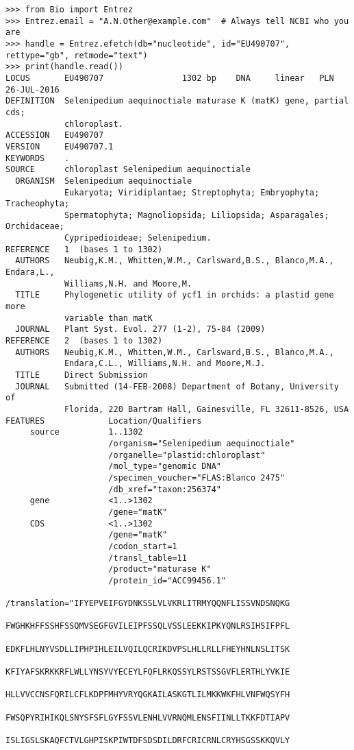 \begin{verbatim}
>>> from Bio import Entrez
>>> Entrez.email = "A.N.Other@example.com"  # Always tell NCBI who you are
>>> handle = Entrez.efetch(db="nucleotide", id="EU490707", rettype="gb", retmode="text")
>>> print(handle.read())
LOCUS       EU490707                1302 bp    DNA     linear   PLN 26-JUL-2016
DEFINITION  Selenipedium aequinoctiale maturase K (matK) gene, partial cds;
            chloroplast.
ACCESSION   EU490707
VERSION     EU490707.1
KEYWORDS    .
SOURCE      chloroplast Selenipedium aequinoctiale
  ORGANISM  Selenipedium aequinoctiale
            Eukaryota; Viridiplantae; Streptophyta; Embryophyta; Tracheophyta;
            Spermatophyta; Magnoliopsida; Liliopsida; Asparagales; Orchidaceae;
            Cypripedioideae; Selenipedium.
REFERENCE   1  (bases 1 to 1302)
  AUTHORS   Neubig,K.M., Whitten,W.M., Carlsward,B.S., Blanco,M.A., Endara,L.,
            Williams,N.H. and Moore,M.
  TITLE     Phylogenetic utility of ycf1 in orchids: a plastid gene more
            variable than matK
  JOURNAL   Plant Syst. Evol. 277 (1-2), 75-84 (2009)
REFERENCE   2  (bases 1 to 1302)
  AUTHORS   Neubig,K.M., Whitten,W.M., Carlsward,B.S., Blanco,M.A.,
            Endara,C.L., Williams,N.H. and Moore,M.J.
  TITLE     Direct Submission
  JOURNAL   Submitted (14-FEB-2008) Department of Botany, University of
            Florida, 220 Bartram Hall, Gainesville, FL 32611-8526, USA
FEATURES             Location/Qualifiers
     source          1..1302
                     /organism="Selenipedium aequinoctiale"
                     /organelle="plastid:chloroplast"
                     /mol_type="genomic DNA"
                     /specimen_voucher="FLAS:Blanco 2475"
                     /db_xref="taxon:256374"
     gene            <1..>1302
                     /gene="matK"
     CDS             <1..>1302
                     /gene="matK"
                     /codon_start=1
                     /transl_table=11
                     /product="maturase K"
                     /protein_id="ACC99456.1"
                     /translation="IFYEPVEIFGYDNKSSLVLVKRLITRMYQQNFLISSVNDSNQKG
                     FWGHKHFFSSHFSSQMVSEGFGVILEIPFSSQLVSSLEEKKIPKYQNLRSIHSIFPFL
                     EDKFLHLNYVSDLLIPHPIHLEILVQILQCRIKDVPSLHLLRLLFHEYHNLNSLITSK
                     KFIYAFSKRKKRFLWLLYNSYVYECEYLFQFLRKQSSYLRSTSSGVFLERTHLYVKIE
                     HLLVVCCNSFQRILCFLKDPFMHYVRYQGKAILASKGTLILMKKWKFHLVNFWQSYFH
                     FWSQPYRIHIKQLSNYSFSFLGYFSSVLENHLVVRNQMLENSFIINLLTKKFDTIAPV
                     ISLIGSLSKAQFCTVLGHPISKPIWTDFSDSDILDRFCRICRNLCRYHSGSSKKQVLY

\end{verbatim}
